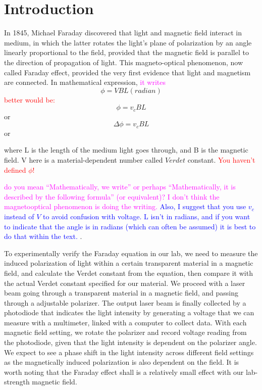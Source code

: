 \documentclass[prb,preprint]{revtex4-1}
\begin{document}
\maketitle 

\section{Introduction} 

In 1845, Michael Faraday discovered that light and magnetic field interact in medium, in which the latter rotates the light's plane of polarization by an angle linearly proportional to the field, provided that the magnetic field is parallel to the direction of propagation of light. This magneto-optical phenomenon, now called Faraday effect, provided the very first evidence that light and magnetism are connected. In mathematical expression, \textcolor{magenta}{it writes}
\begin{equation}
\label{faraday}
\phi =VBL  (radian)
\end{equation}
\textcolor{red}{better would be:}
\begin{equation*}
\label{faraday}
\phi =v_cBL 
\end{equation*}
or
\begin{equation*}
\label{faraday}
\Delta\phi =v_cBL 
\end{equation*}
or

where L is the length of the medium light goes through, and B is the magnetic field. V here is a material-dependent number called $Verdet$ constant. 
\textcolor{red}{You haven't defined $\phi$!}

\textcolor{magenta}{do you mean ``Mathematically, we write'' or perhaps ``Mathematically, it is described by the following formula'' (or equivalent)? I don't think the magnetooptical phenomenon is doing the writing.} \textcolor{blue}{Also, I suggest that you use $v_c$ instead of $V$ to avoid confusion with voltage. L isn't in radians, and if you want to indicate that the angle is in radians (which can often be assumed) it is best to do that within the text. }. 

To experimentally verify the Faraday equation in our lab, we need to measure the induced polarization of light within a certain transparent material in a magnetic field, and calculate the Verdet constant from the equation, then compare it with the actual Verdet constant specified for our material. We proceed with a laser beam going through a transparent material in a magnetic field, and passing through a adjustable polarizer. The output laser beam is finally collected by a photodiode that indicates the light intensity by generating a voltage that we can measure with a multimeter, linked with a computer to collect data. With each magnetic field setting, we rotate the polarizer and record voltage reading from the photodiode, given that the light intensity is dependent on the polarizer angle. We expect to see a phase shift in the light intensity across different field settings as the magnetically induced polarization is also dependent on the field. It is worth noting that the Faraday effect shall is a relatively small effect with our lab-strength magnetic field.
\end{document}
